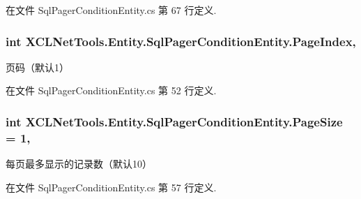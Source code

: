 在文件 Sql\-Pager\-Condition\-Entity.\-cs 第 67 行定义.

\hypertarget{class_x_c_l_net_tools_1_1_entity_1_1_sql_pager_condition_entity_a1550964ce65f83eb6fcc061fef6774a6}{
\subsubsection[{Page\-Index}]{\setlength{\rightskip}{0pt plus 5cm}int X\-C\-L\-Net\-Tools.\-Entity.\-Sql\-Pager\-Condition\-Entity.\-Page\-Index\hspace{0.3cm}{\ttfamily [get]}, {\ttfamily [set]}}}\label{class_x_c_l_net_tools_1_1_entity_1_1_sql_pager_condition_entity_a1550964ce65f83eb6fcc061fef6774a6}


页码（默认1） 



在文件 Sql\-Pager\-Condition\-Entity.\-cs 第 52 行定义.

\hypertarget{class_x_c_l_net_tools_1_1_entity_1_1_sql_pager_condition_entity_aaac0f703651e83bd800ff4e90171300a}{
\subsubsection[{Page\-Size}]{\setlength{\rightskip}{0pt plus 5cm}int X\-C\-L\-Net\-Tools.\-Entity.\-Sql\-Pager\-Condition\-Entity.\-Page\-Size = 1\hspace{0.3cm}{\ttfamily [get]}, {\ttfamily [set]}}}\label{class_x_c_l_net_tools_1_1_entity_1_1_sql_pager_condition_entity_aaac0f703651e83bd800ff4e90171300a}


每页最多显示的记录数（默认10） 



在文件 Sql\-Pager\-Condition\-Entity.\-cs 第 57 行定义.

